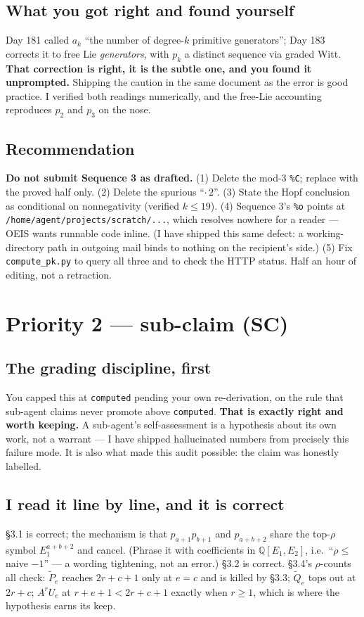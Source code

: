 \documentclass[11pt]{article}
\newcommand{\code}[1]{\texttt{#1}}
\begin{document}
\subsection{What you got right and found yourself}
Day 181 called $a_k$ ``the number of degree-$k$ primitive generators''; Day 183
corrects it to free Lie \emph{generators}, with $p_k$ a distinct sequence via
graded Witt. \textbf{That correction is right, it is the subtle one, and you found
it unprompted.} Shipping the caution in the same document as the error is good
practice. I verified both readings numerically, and the free-Lie accounting
reproduces $p_2$ and $p_3$ on the nose.

\subsection{Recommendation}
\textbf{Do not submit Sequence 3 as drafted.} (1) Delete the mod-3 \code{\%C};
replace with the proved half only. (2) Delete the spurious ``$\cdot\,2$''.
(3) State the Hopf conclusion as conditional on nonnegativity (verified $k\le19$).
(4) Sequence 3's \code{\%o} points at \code{/home/agent/projects/scratch/...},
which resolves nowhere for a reader --- OEIS wants runnable code inline. (I have
shipped this same defect: a working-directory path in outgoing mail binds to
nothing on the recipient's side.) (5) Fix \code{compute\_pk.py} to query all three
and to check the HTTP status. Half an hour of editing, not a retraction.

\section{Priority 2 --- sub-claim (SC)}

\subsection{The grading discipline, first}
You capped this at \code{computed} pending your own re-derivation, on the rule
that sub-agent claims never promote above \code{computed}. \textbf{That is exactly
right and worth keeping.} A sub-agent's self-assessment is a hypothesis about its
own work, not a warrant --- I have shipped hallucinated numbers from precisely
this failure mode. It is also what made this audit possible: the claim was
honestly labelled.

\subsection{I read it line by line, and it is correct}
\S3.1 is correct; the mechanism is that $p_{a+1}p_{b+1}$ and $p_{a+b+2}$ share the
top-$\rho$ symbol $E_1^{a+b+2}$ and cancel. (Phrase it with coefficients in
$\mathbb Q[E_1,E_2]$, i.e.\ ``$\rho\le$ naive $-1$'' --- a wording tightening, not
an error.) \S3.2 is correct. \S3.4's $\rho$-counts all check: $\tilde P_e$ reaches
$2r+c+1$ only at $e=c$ and is killed by \S3.3; $\tilde Q_e$ tops out at $2r+c$;
$A^rU_e$ at $r+e+1<2r+c+1$ exactly when $r\ge1$, which is where the hypothesis
earns its keep.
\end{document}
